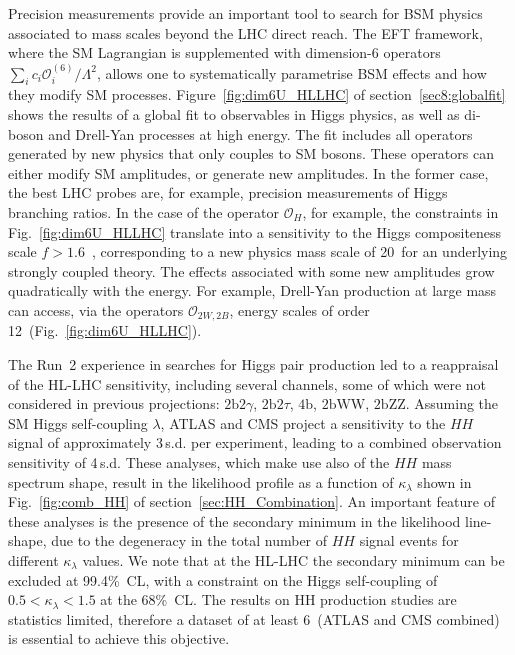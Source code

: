 \documentclass[../report.tex]{subfiles}
\begin{document}
Precision measurements provide an important tool to search for BSM physics associated to mass scales beyond the LHC direct reach. The EFT framework, where the SM Lagrangian is supplemented with dimension-6 operators $\sum_{i} c_i \mathcal{O}^{(6)}_i/\Lambda^2$, allows one to systematically parametrise BSM effects and how they modify SM processes. Figure~\ref{fig:dim6U_HLLHC} of section~\ref{sec8:globalfit} shows the results of a global fit  to observables in Higgs physics, as well as di-boson and Drell-Yan processes at high energy. The fit includes all operators generated by new physics that only couples to SM bosons. These operators can either modify SM amplitudes, or generate new amplitudes. In the former case, the best LHC probes are, for example, precision measurements of Higgs branching ratios. In the case of the operator $\mathcal{O}_H$, 
for example, the constraints in Fig.~\ref{fig:dim6U_HLLHC} translate into a sensitivity to the Higgs compositeness scale $f>1.6$~\UTeV, corresponding to a new physics mass scale of 20~\UTeV for an underlying strongly coupled theory.
The effects associated with some new amplitudes grow quadratically with the energy. For example, Drell-Yan production at large mass can access, via the operators $\mathcal{O}_{2W,2B}$, energy scales of order 12~\UTeV (Fig.~\ref{fig:dim6U_HLLHC}). 

The Run~2 experience in searches for Higgs pair production led to a reappraisal of the HL-LHC sensitivity, including several channels, some of which were not considered in previous projections: $2\textrm{b}2\gamma$, $2\textrm{b}2\tau$, $4\textrm{b}$, $2\textrm{b}\textrm{WW}$, $2\textrm{b}\textrm{ZZ}$.
Assuming the SM Higgs self-coupling $\lambda$, ATLAS and CMS project a sensitivity to the $HH$ signal of approximately 3\,s.d. per experiment, leading to a combined observation sensitivity of 4\,s.d. These analyses, which make use also of the $HH$ mass spectrum shape, result in the likelihood profile as a function of $\kappa_{\lambda}$ shown in Fig.~\ref{fig:comb_HH} of section~\ref{sec:HH_Combination}. An important feature of these analyses is the presence of the secondary minimum in the likelihood line-shape, due to the degeneracy in the total number of $HH$ signal events for different $\kappa_{\lambda}$ values. We note that at the HL-LHC the secondary minimum can be excluded at 99.4\%~CL, with a constraint on the Higgs self-coupling of $0.5 < \kappa_{\lambda} < 1.5 $ at the 68\%\ CL. The results on HH production studies are statistics limited, therefore a dataset of at least 6\,\iab{}  (ATLAS and CMS combined) is essential to achieve this objective.
\end{document}
